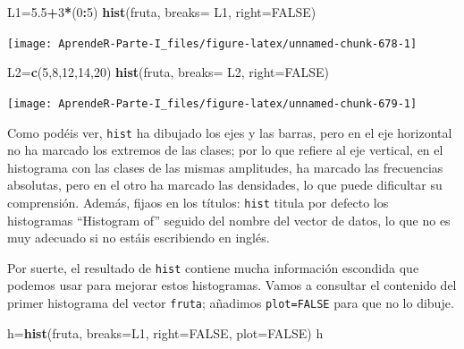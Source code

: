 \documentclass[]{book}
\newenvironment{Shaded}{\begin{snugshade}}{\end{snugshade}}
\newcommand{\DataTypeTok}[1]{\textcolor[rgb]{0.13,0.29,0.53}{#1}}
\newcommand{\DecValTok}[1]{\textcolor[rgb]{0.00,0.00,0.81}{#1}}
\newcommand{\FloatTok}[1]{\textcolor[rgb]{0.00,0.00,0.81}{#1}}
\newcommand{\KeywordTok}[1]{\textcolor[rgb]{0.13,0.29,0.53}{\textbf{#1}}}
\newcommand{\NormalTok}[1]{#1}
\newcommand{\OperatorTok}[1]{\textcolor[rgb]{0.81,0.36,0.00}{\textbf{#1}}}
\newcommand{\OtherTok}[1]{\textcolor[rgb]{0.56,0.35,0.01}{#1}}
\theoremstyle{definition}
\theoremstyle{definition}
\theoremstyle{definition}
\theoremstyle{remark}
\begin{document}
\begin{Shaded}
\begin{Highlighting}[]
\NormalTok{L1=}\FloatTok{5.5}\OperatorTok{+}\DecValTok{3}\OperatorTok{*}\NormalTok{(}\DecValTok{0}\OperatorTok{:}\DecValTok{5}\NormalTok{)}
\KeywordTok{hist}\NormalTok{(fruta, }\DataTypeTok{breaks=}\NormalTok{ L1, }\DataTypeTok{right=}\OtherTok{FALSE}\NormalTok{)}
\end{Highlighting}
\end{Shaded}

\begin{center}\texttt{[image: AprendeR-Parte-I\_files/figure-latex/unnamed-chunk-678-1]} \end{center}

\begin{Shaded}
\begin{Highlighting}[]
\NormalTok{L2=}\KeywordTok{c}\NormalTok{(}\DecValTok{5}\NormalTok{,}\DecValTok{8}\NormalTok{,}\DecValTok{12}\NormalTok{,}\DecValTok{14}\NormalTok{,}\DecValTok{20}\NormalTok{)}
\KeywordTok{hist}\NormalTok{(fruta, }\DataTypeTok{breaks=}\NormalTok{ L2, }\DataTypeTok{right=}\OtherTok{FALSE}\NormalTok{)}
\end{Highlighting}
\end{Shaded}

\begin{center}\texttt{[image: AprendeR-Parte-I\_files/figure-latex/unnamed-chunk-679-1]} \end{center}

Como podéis ver, \texttt{hist} ha dibujado los ejes y las barras, pero en el eje horizontal no ha marcado los extremos de las clases; por lo que refiere al eje vertical, en el histograma con las clases de las mismas amplitudes, ha marcado las frecuencias absolutas, pero en el otro ha marcado las densidades, lo que puede dificultar su comprensión.
Además, fijaos en los títulos: \texttt{hist} titula por defecto los histogramas ``Histogram of'' seguido del nombre del vector de datos, lo que no es muy adecuado si no estáis escribiendo en inglés.

Por suerte, el resultado de \texttt{hist} contiene mucha información escondida que podemos usar para mejorar estos histogramas. Vamos a consultar el contenido del primer histograma del vector \texttt{fruta}; añadimos \texttt{plot=FALSE} para que no lo dibuje.

\begin{Shaded}
\begin{Highlighting}[]
\NormalTok{h=}\KeywordTok{hist}\NormalTok{(fruta, }\DataTypeTok{breaks=}\NormalTok{L1, }\DataTypeTok{right=}\OtherTok{FALSE}\NormalTok{, }\DataTypeTok{plot=}\OtherTok{FALSE}\NormalTok{)}
\NormalTok{h}
\end{Highlighting}
\end{Shaded}
\end{document}
